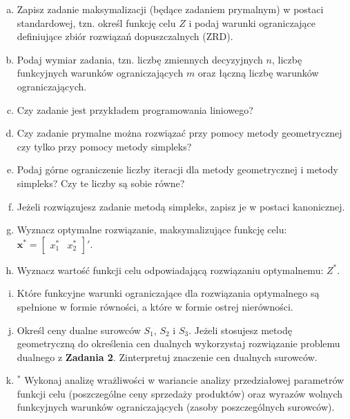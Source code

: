 \documentclass[11pt]{article}
\begin{document}
\begin{enumerate}[a)]
\item Zapisz zadanie maksymalizacji (będące zadaniem prymalnym) w postaci standardowej, tzn. określ funkcję celu $Z$ i podaj warunki ograniczające definiujące zbiór rozwiązań dopuszczalnych (ZRD).
\item Podaj wymiar zadania, tzn. liczbę zmiennych decyzyjnych $n$, liczbę funkcyjnych warunków ograniczających $m$ oraz łączną liczbę warunków ograniczających.
\item Czy zadanie jest przykładem programowania liniowego?
\item Czy zadanie prymalne można rozwiązać przy pomocy metody geometrycznej czy tylko przy pomocy metody simpleks?
\item Podaj górne ograniczenie liczby iteracji dla metody geometrycznej i metody simpleks? Czy te liczby są sobie równe?
\item Jeżeli rozwiązujesz zadanie metodą simpleks, zapisz je w postaci kanonicznej.
\item Wyznacz optymalne rozwiązanie, maksymalizujące funkcję celu: $\mathbf{x^\ast}=\begin{bmatrix}x_1^\ast & x_2^\ast \end{bmatrix} '$.
\item Wyznacz wartość funkcji celu odpowiadającą rozwiązaniu optymalnemu: $Z^\ast$.
\item Które funkcyjne warunki ograniczające  dla rozwiązania optymalnego są spełnione w formie równości, a które w formie ostrej nierówności.
\item Określ ceny dualne surowców $S_1$, $S_2$ i $S_3$. Jeżeli stosujesz metodę geometryczną do określenia cen dualnych wykorzystaj rozwiązanie problemu dualnego z \textbf{Zadania 2}. Zinterpretuj znaczenie cen dualnych surowców.
\item$^\ast$ Wykonaj analizę wrażliwości w wariancie analizy przedziałowej parametrów funkcji celu (poszczególne ceny sprzedaży produktów) oraz wyrazów wolnych funkcyjnych warunków ograniczających (zasoby poszczególnych surowców).   
\end{enumerate}
\end{document}
